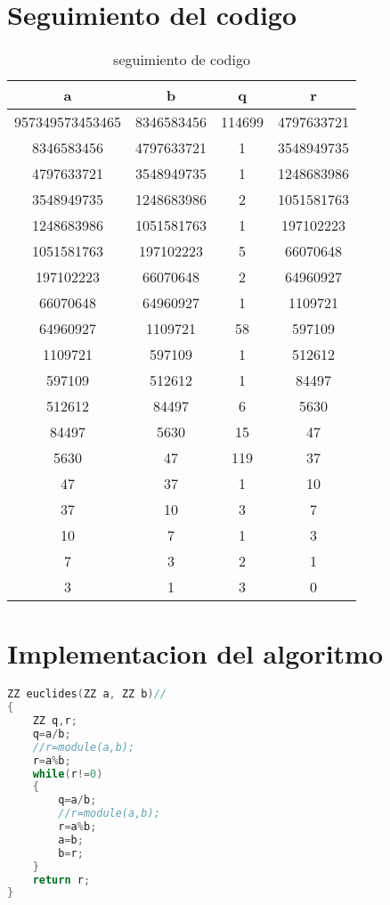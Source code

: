 \section{Seguimiento del codigo}
\begin{table}[H]
\label{tablax}
\begin{center}
\begin{tabular}{|c|c|c|c|}
\hline 
a&b&q&r \\
\hline
957349573453465&8346583456&114699&4797633721\\\hline
8346583456&4797633721&1&3548949735\\\hline
4797633721&3548949735&1&1248683986\\\hline
3548949735&1248683986&2&1051581763\\\hline
1248683986&1051581763&1&197102223\\\hline
1051581763&197102223&5&66070648\\\hline
197102223&66070648&2&64960927\\\hline
66070648&64960927&1&1109721\\\hline
64960927&1109721&58&597109\\\hline
1109721&597109&1&512612\\\hline
597109&512612&1&84497\\\hline
512612&84497&6&5630\\\hline
84497&5630&15&47\\\hline
5630&47&119&37\\\hline
47&37&1&10\\\hline
37&10&3&7\\\hline
10&7&1&3\\\hline
7&3&2&1\\\hline
3&1&3&0\\\hline
\end{tabular}
\end{center}
\caption{seguimiento de codigo}
\end{table}


\section{Implementacion del algoritmo}
\begin{lstlisting}[language=C++]
ZZ euclides(ZZ a, ZZ b)//
{
    ZZ q,r;
    q=a/b;
    //r=module(a,b);
    r=a%b;
    while(r!=0)
    {
        q=a/b;
        //r=module(a,b);
        r=a%b;
        a=b;
        b=r;
    }
    return r;
}
\end{lstlisting}
